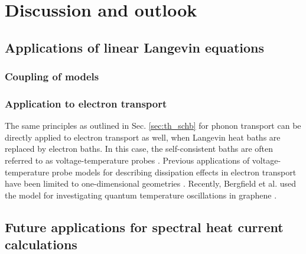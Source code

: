
\chapter{Discussion and outlook}


\section{Applications of linear Langevin equations}

\subsection{Coupling of models}

\subsection{Application to electron transport}


The same principles as outlined in Sec. \ref{sec:th_schb} for phonon transport can be directly applied to electron transport as well, when Langevin heat baths are replaced by electron baths. In this case, the self-consistent baths are often referred to as voltage-temperature probes \cite{jacquet09}. Previous applications of voltage-temperature probe models for describing dissipation effects in electron transport have been limited to one-dimensional geometries \cite{buttiker86,damato90,jacquet09,jacquet12}. Recently, Bergfield et al. used the model for investigating quantum temperature oscillations in graphene \cite{bergfield15}.

\section{Future applications for spectral heat current calculations}